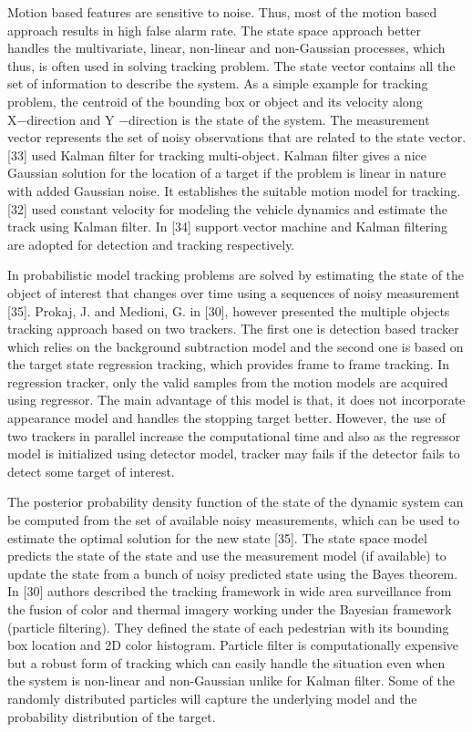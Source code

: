 \pagebreak

Motion based features are sensitive to noise. Thus, most of the motion based approach results in high false alarm rate. The state space approach better handles the multivariate, linear, non-linear and non-Gaussian processes, which thus, is often used in solving tracking problem. The state vector contains all the set of information to describe the system. As a simple example for
tracking problem, the centroid of the bounding box or object and its velocity along X−direction and Y −direction is the state of the system. The measurement vector represents the set of noisy
observations that are related to the state vector. [33] used Kalman filter for tracking multi-object. Kalman filter gives a nice Gaussian solution for the location of a target if the problem is linear in nature with added Gaussian noise. It establishes the suitable motion model for tracking. [32] used constant velocity for modeling the vehicle dynamics and estimate the track using Kalman filter. In [34] support vector machine and Kalman filtering are adopted for detection and tracking respectively.

In probabilistic model tracking problems are solved by estimating the state of the object of interest that changes over time using a sequences of noisy measurement [35]. Prokaj, J. and Medioni, G. in [30], however presented the multiple objects tracking approach based on two trackers. The first one is detection based tracker which relies on the background subtraction model and the second one is based on the target state regression tracking, which provides frame to frame tracking. In regression tracker, only the valid samples from the motion models are acquired using regressor. The main advantage of this model is that, it does not incorporate appearance model and handles the stopping target better. However, the use of two trackers in parallel increase the computational time and also as the regressor model is initialized using detector model, tracker may fails if the detector fails to detect some target of interest.

The posterior probability density function of the state of the dynamic system can be computed from the set of available noisy measurements, which can be used to estimate the optimal solution for the new state [35]. The state space model predicts the state of the state and use the measurement model (if available) to update the state from a bunch of noisy predicted state using the Bayes theorem. In [30] authors described the tracking framework in wide area surveillance from the fusion of color and thermal imagery working under the Bayesian framework (particle filtering).
They defined the state of each pedestrian with its bounding box location and 2D color histogram. Particle filter is computationally expensive but a robust form of tracking which can easily handle the situation even when the system is non-linear and non-Gaussian unlike for Kalman filter. Some of the randomly distributed particles will capture the underlying model and the probability distribution of the target.

